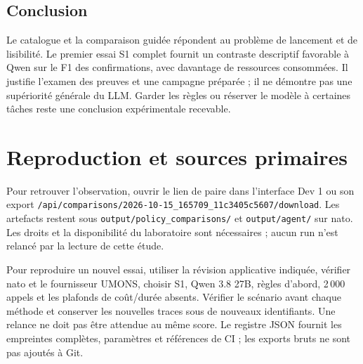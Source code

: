 \documentclass[11pt,a4paper]{article}
\newcommand{\code}[1]{\nolinkurl{#1}}
\begin{document}
\subsection{Conclusion}
Le catalogue et la comparaison guidée répondent au problème de lancement et de
lisibilité. Le premier essai S1 complet fournit un contraste descriptif favorable
à Qwen sur le F1 des confirmations, avec davantage de ressources consommées.
Il justifie l'examen des preuves et une campagne préparée ; il ne démontre pas
une supériorité générale du LLM. Garder les règles ou réserver le modèle à
certaines tâches reste une conclusion expérimentale recevable.

\clearpage
\section{Reproduction et sources primaires}
Pour retrouver l'observation, ouvrir le lien de paire dans l'interface Dev 1 ou
son export \code{/api/comparisons/2026-10-15_165709_11c3405c5607/download}.
Les artefacts restent sous \code{output/policy_comparisons/} et
\code{output/agent/} sur nato. Les droits et la disponibilité du laboratoire
sont nécessaires ; aucun run n'est relancé par la lecture de cette étude.

Pour reproduire un nouvel essai, utiliser la révision applicative indiquée,
vérifier nato et le fournisseur UMONS, choisir S1, Qwen 3.8 27B, règles d'abord,
2\,000 appels et les plafonds de coût/durée absents. Vérifier le scénario avant
chaque méthode et conserver les nouvelles traces sous de nouveaux identifiants.
Une relance ne doit pas être attendue au même score. Le registre JSON fournit
les empreintes complètes, paramètres et références de CI ; les exports bruts ne
sont pas ajoutés à Git.
\end{document}
